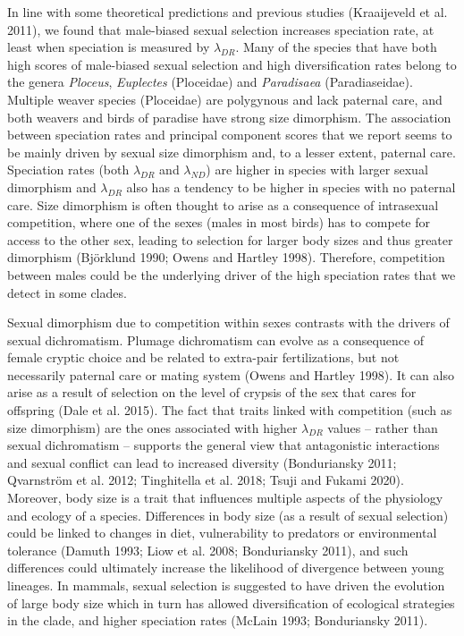 \documentclass[]{article}
\begin{document}
In line with some theoretical predictions and previous studies
(Kraaijeveld et al. 2011), we found that male-biased sexual selection
increases speciation rate, at least when speciation is measured by
\(\lambda_{DR}\). Many of the species that have both high scores of
male-biased sexual selection and high diversification rates belong to
the genera \emph{Ploceus}, \emph{Euplectes} (Ploceidae) and
\emph{Paradisaea} (Paradiaseidae). Multiple weaver species (Ploceidae)
are polygynous and lack paternal care, and both weavers and birds of
paradise have strong size dimorphism. The association between speciation
rates and principal component scores that we report seems to be mainly
driven by sexual size dimorphism and, to a lesser extent, paternal care.
Speciation rates (both \(\lambda_{DR}\) and \(\lambda_{ND}\)) are higher
in species with larger sexual dimorphism and \(\lambda_{DR}\) also has a
tendency to be higher in species with no paternal care. Size dimorphism
is often thought to arise as a consequence of intrasexual competition,
where one of the sexes (males in most birds) has to compete for access
to the other sex, leading to selection for larger body sizes and thus
greater dimorphism (Björklund 1990; Owens and Hartley 1998). Therefore,
competition between males could be the underlying driver of the high
speciation rates that we detect in some clades.

Sexual dimorphism due to competition within sexes contrasts with the
drivers of sexual dichromatism. Plumage dichromatism can evolve as a
consequence of female cryptic choice and be related to extra-pair
fertilizations, but not necessarily paternal care or mating system
(Owens and Hartley 1998). It can also arise as a result of selection on
the level of crypsis of the sex that cares for offspring (Dale et al.
2015). The fact that traits linked with competition (such as size
dimorphism) are the ones associated with higher \(\lambda_{DR}\) values
-- rather than sexual dichromatism -- supports the general view that
antagonistic interactions and sexual conflict can lead to increased
diversity (Bonduriansky 2011; Qvarnström et al. 2012; Tinghitella et al.
2018; Tsuji and Fukami 2020). Moreover, body size is a trait that
influences multiple aspects of the physiology and ecology of a species.
Differences in body size (as a result of sexual selection) could be
linked to changes in diet, vulnerability to predators or environmental
tolerance (Damuth 1993; Liow et al. 2008; Bonduriansky 2011), and such
differences could ultimately increase the likelihood of divergence
between young lineages. In mammals, sexual selection is suggested to
have driven the evolution of large body size which in turn has allowed
diversification of ecological strategies in the clade, and higher
speciation rates (McLain 1993; Bonduriansky 2011).
\end{document}
